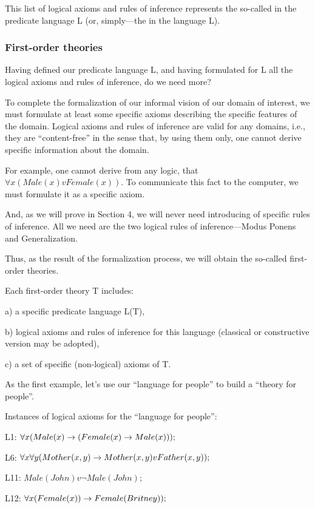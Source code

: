 This list of logical axioms and rules of inference represents the so-called  in the predicate language L (or, simply---the  in the language L).

\subsubsection*{First-order theories}

Having defined our predicate language L, and having formulated for L all the logical axioms and rules of inference, do we need more?

To complete the formalization of our informal vision of our domain of interest, we must formulate at least some specific axioms describing the specific features of the domain. Logical axioms and rules of inference are valid for any domains, i.e., they are ``content-free'' in the sense that, by using them only, one cannot derive specific information about the domain.

For example, one cannot derive from any logic, that \(\forall x (Male(x) v Female(x))\). To communicate this fact to the computer, we must formulate it as a specific axiom.

And, as we will prove in Section 4, we will never need introducing of specific rules of inference. All we need are the two logical rules of inference---Modus Ponens and Generalization.

Thus, as the result of the formalization process, we will obtain the so-called first-order theories.

Each first-order theory T includes:

a) a specific predicate language L(T),

b) logical axioms and rules of inference for this language (classical or constructive version may be adopted),

c) a set of specific (non-logical) axioms of T.

As the first example, let's use our ``language for people'' to build a ``theory for people''.

Instances of logical axioms for the ``language for people'':

L1: \(\forall x(Male(x)\rightarrow (Female(x)\rightarrow Male(x)));\)

L6: \(\forall x\forall y(Mother(x, y)\rightarrow Mother(x, y) v Father(x, y));\)

L11: \(Male(John) v \neg Male(John);\)

L12: \(\forall x(Female(x))\rightarrow Female(Britney));\)

